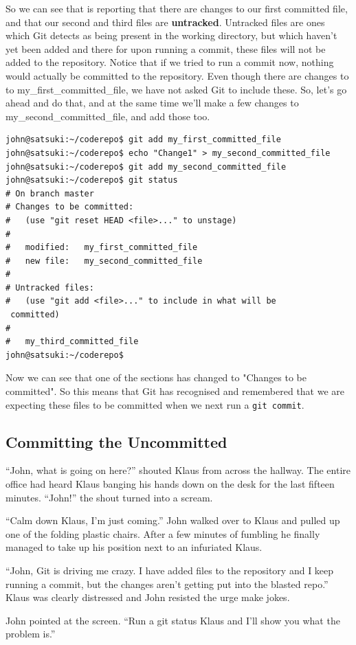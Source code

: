 So we can see that  is reporting that there are changes to our first committed file, and that our second and third files are \textbf{untracked}.
Untracked files are ones which Git detects as being present in the working directory, but which haven't yet been added and there for upon running a commit, these files will not be added to the repository.
Notice that if we tried to run a commit now, nothing would actually be committed to the repository.
Even though there are changes to to my\_first\_committed\_file, we have not asked Git to include these.
So, let's go ahead and do that, and at the same time we'll make a few changes to my\_second\_committed\_file, and add those too.

\begin{Verbatim}
john@satsuki:~/coderepo$ git add my_first_committed_file
john@satsuki:~/coderepo$ echo "Change1" > my_second_committed_file
john@satsuki:~/coderepo$ git add my_second_committed_file
john@satsuki:~/coderepo$ git status
# On branch master
# Changes to be committed:
#   (use "git reset HEAD <file>..." to unstage)
#
#	modified:   my_first_committed_file
#	new file:   my_second_committed_file
#
# Untracked files:
#   (use "git add <file>..." to include in what will be
 committed)
#
#	my_third_committed_file
john@satsuki:~/coderepo$
\end{Verbatim}

Now we can see that one of the sections has changed to "Changes to be committed".
So this means that Git has recognised and remembered that we are expecting these files to be committed when we next run a \texttt{git commit}.

\subsection{Committing the Uncommitted}

\begin{trenches}
``John, what is going on here?'' shouted Klaus from across the hallway.
The entire office had heard Klaus banging his hands down on the desk for the last fifteen minutes.
``John!'' the shout turned into a scream.

``Calm down Klaus, I'm just coming.''
John walked over to Klaus and pulled up one of the folding plastic chairs.
After a few minutes of fumbling he finally managed to take up his position next to an infuriated Klaus.

``John, Git is driving me crazy. I have added files to the repository and I keep running a commit, but the changes aren't getting put into the blasted repo.''
Klaus was clearly distressed and John resisted the urge make jokes.

John pointed at the screen.
``Run a git status Klaus and I'll show you what the problem is.''
\end{trenches}

